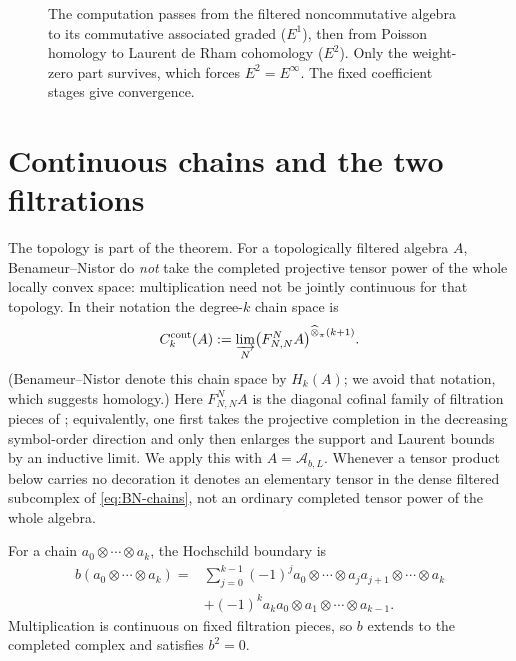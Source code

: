 \documentclass[11pt,oneside,reqno]{article}
\DeclareMathOperator{\HH}{HH}
\DeclareMathOperator{\gr}{gr}
\newcommand{\cA}{\mathcal A}
\newcommand{\Tbstar}{{}^{b}T^*X}
\theoremstyle{plain}
\theoremstyle{definition}
\theoremstyle{remark}
\begin{document}
\begin{figure}[htbp]
\centering
{}
\caption[The Hochschild-to-de Rham computation]{The computation passes from
the filtered noncommutative algebra to its commutative associated graded
(\(E^1\)), then from Poisson homology to Laurent de Rham cohomology
(\(E^2\)). Only the weight-zero part survives, which forces
\(E^2=E^\infty\). The fixed coefficient stages give convergence.}
\end{figure}

\section{Continuous chains and the two filtrations}

The topology is part of the theorem.  For a topologically filtered algebra
\(A\), Benameur--Nistor do \emph{not} take the completed projective tensor
power of the whole locally convex space: multiplication need not be jointly
continuous for that topology.  In their notation the degree-\(k\) chain
space is
\begin{equation}\label{eq:BN-chains}
 C_k^{\mathrm{cont}}(A)
 :=\varinjlim_{N}
   \bigl(F^{N}_{N,N}A\bigr)^{\widehat\otimes_\pi(k+1)}.
\end{equation}
(Benameur--Nistor denote this chain space by \(H_k(A)\); we avoid that
notation, which suggests homology.) Here \(F^{N}_{N,N}A\) is the diagonal
cofinal family of filtration pieces of \cite{BNfamilies}; equivalently, one
first takes the projective completion in the decreasing symbol-order
direction and only then enlarges the support and Laurent bounds by an
inductive limit.  We apply this with \(A=\cA_{b,L}\).
Whenever a tensor product below carries no decoration it denotes an
elementary tensor in the dense filtered subcomplex of
\eqref{eq:BN-chains}, not an ordinary completed tensor power of the whole
algebra.

For a chain \(a_0\otimes\cdots\otimes a_k\), the Hochschild boundary is
\begin{align*}
 b(a_0\otimes\cdots\otimes a_k)
 ={}&\sum_{j=0}^{k-1}(-1)^j
 a_0\otimes\cdots\otimes a_ja_{j+1}\otimes\cdots\otimes a_k\\
 &+(-1)^ka_ka_0\otimes a_1\otimes\cdots\otimes a_{k-1}.
\end{align*}
Multiplication is continuous on fixed filtration pieces, so \(b\) extends to
the completed complex and satisfies \(b^2=0\).
\end{document}
